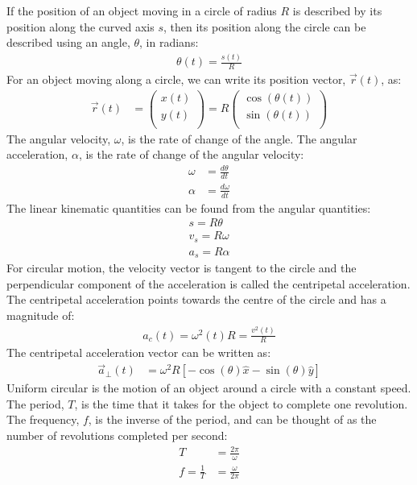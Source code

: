 \begin{chapterSummary}
If the position of an object moving in a circle of radius $R$ is described by its position along the curved axis $s$, then its position along the circle can be described using an angle, $\theta$, in radians:
\begin{align*}
\theta(t)=\frac{s(t)}{R}
\end{align*}
For an object moving along a circle, we can write its position vector, $\vec r(t)$, as:
\begin{align*}
\vec r(t)&= \begin{pmatrix}
          x(t) \\
          y(t) \\
        \end{pmatrix}
        =R \begin{pmatrix}
          \cos(\theta(t)) \\
          \sin(\theta(t)) \\
        \end{pmatrix}
\end{align*}
The angular velocity, $\omega$, is the rate of change of the angle. The angular acceleration, $\alpha$, is the rate of change of the angular velocity:
\begin{align*}
\omega &= \frac{d\theta}{dt}\\
\alpha &= \frac{d\omega}{dt}
\end{align*}
The linear kinematic quantities can be found from the angular quantities:
\begin{align*}
s=R\theta\\
v_s=R\omega\\
a_s=R\alpha
\end{align*}
For circular motion, the velocity vector is tangent to the circle and the perpendicular component of the acceleration is called the centripetal acceleration. The centripetal acceleration points towards the centre of the circle and has a magnitude of:
\begin{align*}
a_c(t) = \omega^2(t)R = \frac{v^2(t)}{R}
\end{align*}
The centripetal acceleration vector can be written as:
\begin{align*}
\vec a_{\bot}(t)&=\omega^2 R[-\cos(\theta)\hat x-\sin(\theta)\hat y]
\end{align*}
Uniform circular is the motion of an object around a circle with a constant speed. The period, $T$, is the time that it takes for the object to complete one revolution. The frequency, $f$, is the inverse of the period, and can be thought of as the number of revolutions completed per second:
\begin{align*}
T&=\frac{2\pi}{\omega}\\
f=\frac{1}{T}&=\frac{\omega}{2\pi}
\end{align*}
\end{chapterSummary}



